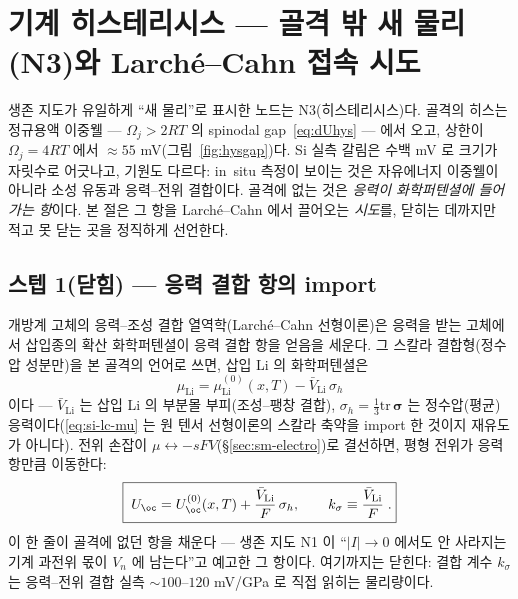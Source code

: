 \section{기계 히스테리시스 --- 골격 밖 새 물리(N3)와 Larch\'e--Cahn 접속 시도}\label{sec:si-mech}
생존 지도가 유일하게 ``새 물리''로 표시한 노드는 N3(히스테리시스)다. 골격의 히스는 정규용액 이중웰
--- $\Omega_j>2RT$ 의 spinodal gap~\eqref{eq:dUhys} --- 에서 오고, 상한이 $\Omega_j{=}4RT$ 에서
$\approx55$ mV(그림~\ref{fig:hysgap})다. Si 실측 갈림은 수백 mV 로\cite{obrovac_chevrier2014} 크기가
자릿수로 어긋나고, 기원도 다르다: in~situ 측정이 보이는 것은 자유에너지 이중웰이 아니라 소성 유동과
응력--전위 결합이다\cite{sethuraman_stressevo2010,sethuraman_stresspot2010}. 골격에 없는 것은
\emph{응력이 화학퍼텐셜에 들어가는 항}이다. 본 절은 그 항을 Larch\'e--Cahn\cite{larchecahn1973} 에서
끌어오는 \emph{시도}를, 닫히는 데까지만 적고 못 닫는 곳을 정직하게 선언한다.

\subsection{스텝 1(닫힘) --- 응력 결합 항의 import}\label{ssec:mech-attempt}
개방계 고체의 응력--조성 결합 열역학(Larch\'e--Cahn 선형이론\cite{larchecahn1973})은 응력을 받는 고체에서
삽입종의 확산 화학퍼텐셜이 응력 결합 항을 얻음을 세운다. 그 스칼라 결합형(정수압 성분만)을 본 골격의
언어로 쓰면, 삽입 Li 의 화학퍼텐셜은
\begin{equation}
\mu_\mathrm{Li}=\mu_\mathrm{Li}^{(0)}(x,T)-\bar V_\mathrm{Li}\,\sigma_h
\label{eq:si-lc-mu}
\end{equation}
이다 --- $\bar V_\mathrm{Li}$ 는 삽입 Li 의 부분몰 부피(조성--팽창 결합), $\sigma_h=\tfrac13\mathrm{tr}\,\bm\sigma$
는 정수압(평균) 응력이다(\eqref{eq:si-lc-mu} 는 원 텐서 선형이론의 스칼라 축약을 import 한 것이지
재유도가 아니다). 전위 손잡이 $\mu\leftrightarrow-sFV$(\S\ref{sec:sm-electro})로 결선하면, 평형 전위가
응력 항만큼 이동한다:
\begin{equation}
\boxed{\;U_\oc=U_\oc^{(0)}(x,T)+\frac{\bar V_\mathrm{Li}}{F}\,\sigma_h,
\qquad
k_\sigma\equiv\frac{\bar V_\mathrm{Li}}{F}\;.}
\label{eq:si-lc-U}
\end{equation}
이 한 줄이 골격에 없던 항을 채운다 --- 생존 지도 N1 이 ``$|I|\!\to\!0$ 에서도 안 사라지는 기계 과전위
몫이 $V_n$ 에 남는다''고 예고한 그 항이다. 여기까지는 닫힌다: 결합 계수 $k_\sigma$ 는 응력--전위 결합
실측 $\sim100$--$120$ mV/GPa\cite{sethuraman_stresspot2010} 로 직접 읽히는 물리량이다.


